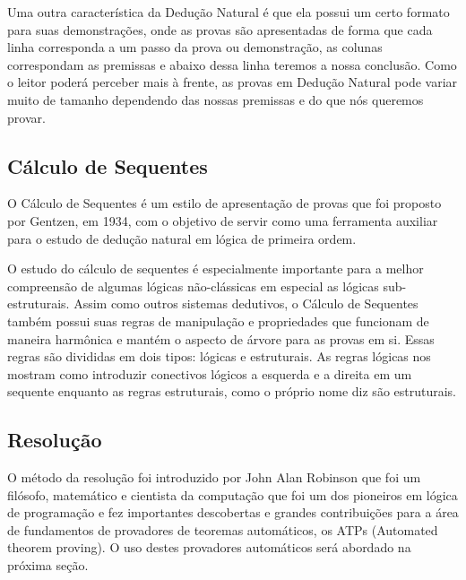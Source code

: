 

Uma outra característica da Dedução Natural é que ela possui um certo formato para suas demonstrações, onde as provas são apresentadas de forma que cada linha corresponda a um passo da prova ou demonstração, as colunas correspondam as premissas e abaixo dessa linha teremos a nossa conclusão.
Como o leitor poderá perceber mais à frente, as provas em Dedução Natural pode variar muito de tamanho dependendo das nossas premissas e do que nós queremos provar.

\subsection{Cálculo de Sequentes}
O Cálculo de Sequentes é um estilo de apresentação de provas que foi proposto por Gentzen, em 1934, com o objetivo de servir como uma
ferramenta auxiliar para o estudo de dedução natural em lógica de primeira ordem.


O estudo do cálculo de sequentes é especialmente importante para a melhor compreensão de algumas lógicas não-clássicas em especial as lógicas sub-estruturais.
Assim como outros sistemas dedutivos, 
o Cálculo de Sequentes também possui suas regras de manipulação e propriedades que funcionam de maneira harmônica e mantém o aspecto de árvore para as provas em si.
Essas regras são divididas em dois tipos: lógicas e estruturais.
As regras lógicas nos mostram como introduzir conectivos lógicos a esquerda e a direita em um sequente enquanto as regras estruturais,
como o próprio nome diz são estruturais.






\subsection{Resolução}

 O método da resolução foi introduzido por John Alan Robinson que foi um filósofo, matemático e cientista da computação que foi um dos pioneiros em lógica de programação e fez importantes descobertas e grandes contribuições para a área de fundamentos
de provadores de teoremas automáticos, os ATPs (Automated theorem proving).
O uso destes provadores automáticos será abordado na próxima seção.

